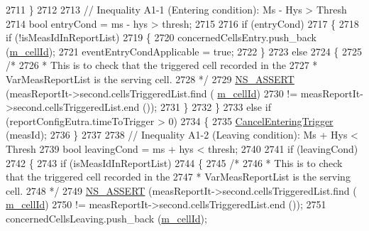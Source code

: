 \begin{DoxyCode}
2711           \}
2712 
2713         \textcolor{comment}{// Inequality A1-1 (Entering condition): Ms - Hys > Thresh}
2714         \textcolor{keywordtype}{bool} entryCond = ms - hys > thresh;
2715 
2716         \textcolor{keywordflow}{if} (entryCond)
2717           \{
2718             \textcolor{keywordflow}{if} (!isMeasIdInReportList)
2719               \{
2720                 concernedCellsEntry.push\_back (\hyperlink{classns3_1_1LteUeRrc_aa9d3317734eea9158371d9fccf3a0c48}{m\_cellId});
2721                 eventEntryCondApplicable = \textcolor{keyword}{true};
2722               \}
2723             \textcolor{keywordflow}{else}
2724               \{
2725                 \textcolor{comment}{/*}
2726 \textcolor{comment}{                 * This is to check that the triggered cell recorded in the}
2727 \textcolor{comment}{                 * VarMeasReportList is the serving cell.}
2728 \textcolor{comment}{                 */}
2729                 \hyperlink{assert_8h_a6dccdb0de9b252f60088ce281c49d052}{NS\_ASSERT} (measReportIt->second.cellsTriggeredList.find (
      \hyperlink{classns3_1_1LteUeRrc_aa9d3317734eea9158371d9fccf3a0c48}{m\_cellId})
2730                            != measReportIt->second.cellsTriggeredList.end ());
2731               \}
2732           \}
2733         \textcolor{keywordflow}{else} \textcolor{keywordflow}{if} (reportConfigEutra.timeToTrigger > 0)
2734           \{
2735             \hyperlink{classns3_1_1LteUeRrc_a9221d85411de5dd375b71b44e3331c5c}{CancelEnteringTrigger} (measId);
2736           \}
2737 
2738         \textcolor{comment}{// Inequality A1-2 (Leaving condition): Ms + Hys < Thresh}
2739         \textcolor{keywordtype}{bool} leavingCond = ms + hys < thresh;
2740 
2741         \textcolor{keywordflow}{if} (leavingCond)
2742           \{
2743             \textcolor{keywordflow}{if} (isMeasIdInReportList)
2744               \{
2745                 \textcolor{comment}{/*}
2746 \textcolor{comment}{                 * This is to check that the triggered cell recorded in the}
2747 \textcolor{comment}{                 * VarMeasReportList is the serving cell.}
2748 \textcolor{comment}{                 */}
2749                 \hyperlink{assert_8h_a6dccdb0de9b252f60088ce281c49d052}{NS\_ASSERT} (measReportIt->second.cellsTriggeredList.find (
      \hyperlink{classns3_1_1LteUeRrc_aa9d3317734eea9158371d9fccf3a0c48}{m\_cellId})
2750                            != measReportIt->second.cellsTriggeredList.end ());
2751                 concernedCellsLeaving.push\_back (\hyperlink{classns3_1_1LteUeRrc_aa9d3317734eea9158371d9fccf3a0c48}{m\_cellId});

\end{DoxyCode}
